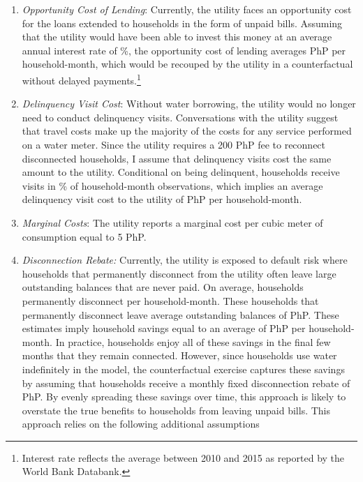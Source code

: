 \documentclass[12pt]{article}
\begin{document}
\begin{enumerate}
\item \textit{Opportunity Cost of Lending}: Currently, the utility faces an opportunity cost for the loans extended to households in the form of unpaid bills.  Assuming that the utility would have been able to invest this money at an average annual interest rate of \unskip\%, the opportunity cost of lending averages PhP per household-month, which would be recouped by the utility in a counterfactual without delayed payments.\footnote{Interest rate reflects the average between 2010 and 2015 as reported by the World Bank Databank.}

\item \textit{Delinquency Visit Cost}: Without water borrowing, the utility would no longer need to conduct delinquency visits.  Conversations with the utility suggest that travel costs make up the majority of the costs for any service performed on a water meter.  Since the utility requires a 200 PhP fee to reconnect disconnected households, I assume that delinquency visits cost the same amount to the utility.  Conditional on being delinquent, households receive visits in \unskip\% of household-month observations, which implies an average delinquency visit cost to the utility of PhP per household-month. 

\item \textit{Marginal Costs}: The utility reports a marginal cost per cubic meter of consumption equal to 5 PhP.

\item \textit{Disconnection Rebate:}  Currently, the utility is exposed to default risk where households that permanently disconnect from the utility often leave large outstanding balances that are never paid.  On average, households permanently disconnect per household-month.  These households that permanently disconnect leave average outstanding balances of PhP.  These estimates imply household savings equal to an average of PhP per household-month.  In practice, households enjoy all of these savings in the final few months that they remain connected.  However, since households use water indefinitely in the model, the counterfactual exercise captures these savings by assuming that households receive a monthly fixed disconnection rebate of PhP.  By evenly spreading these savings over time, this approach is likely to overstate the true benefits to households from leaving unpaid bills.  This approach relies on the following additional assumptions 


\end{enumerate}
\end{document}
